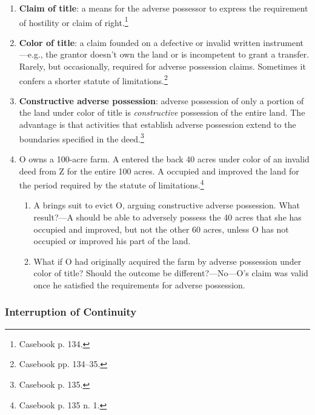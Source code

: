 \begin{enumerate}
    \item \textbf{Claim of title}: a means for the adverse possessor to 
    express the requirement of hostility or claim of right.\footnote{Casebook 
    p. 134.}
    \item \textbf{Color of title}: a claim founded on a defective or invalid 
    written instrument---e.g., the grantor doesn't own the land or is 
    incompetent to grant a transfer. Rarely, but occasionally, required for 
    adverse possession claims. Sometimes it confers a shorter statute of 
    limitations.\footnote{Casebook pp. 134--35.}
    \item \textbf{Constructive adverse possession}: adverse possession of only 
    a portion of the land under color of title is \emph{constructive} 
    possession of the entire land. The advantage is that activities that 
    establish adverse possession extend to the boundaries specified in the 
    deed.\footnote{Casebook p. 135.}
    \item O owns a 100-acre farm. A entered the back 40 acres under color of 
    an invalid deed from Z for the entire 100 acres. A occupied and improved 
    the land for the period required by the statute of 
    limitations.\footnote{Casebook p. 135 n. 1.}
    \begin{enumerate}
        \item A brings suit to evict O, arguing constructive adverse 
        possession. What result?---A should be able to adversely possess the 
        40 acres that she has occupied and improved, but not the other 
        60 acres, unless O has not occupied or improved his part of the land.
        \item What if O had originally acquired the farm by adverse possession 
        under color of title? Should the outcome be different?---No---O's 
        claim was valid once he satisfied the requirements for adverse 
        possession.
    \end{enumerate}
\end{enumerate}

\subsubsection{Interruption of Continuity}

